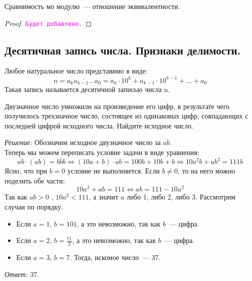 \documentclass[11pt]{article}
\begin{document}
\begin{statement}

    Сравнимость мо модулю~--- отношение эквивалентности.

\end{statement}
\begin{proof}

    \textcolor{magenta}{\texttt{Будет добавлено.}}

\end{proof}

\subsection{Десятичная запись числа. Признаки делимости.}

\begin{definition}
    Любое натуральное число представимо в виде:
\[ n = \overline{a_{k}a_{k - 1}\ldots a_0} = a_k \cdot 10^k + a_{k - 1} \cdot 10^{k -1} + \ldots + a_0 \]
Такая запись называется десятичной записью числа n.
\end{definition}

\begin{example}
	Двузначное число умножили на произведение его цифр, в результате чего получилось трехзначное число, состоящее из одинаковых цифр, совпадающих с последней цифрой исходного числа. Найдите исходное число.
\end{example}
\textit{Решение:}
Обозначим исходное двузначное число за $\overline{ab}$.\\
Теперь мы можем переписать условие задачи в виде уравнения:
\[ \overline{ab} \cdot (ab) = \overline{bbb} \Leftrightarrow
(10a + b) \cdot ab = 100b + 10b + b \Leftrightarrow
10a^2b + ab^2 = 111b \]
Ясно, что при $b = 0$ условие не выполняется. Если $b \neq 0$, то на него можно поделить обе части:
\[10a^2 + ab = 111 \Leftrightarrow ab = 111 - 10a^2\]
Так как $ab > 0$ , $10a^2 < 111$, а значит $a$ либо 1, либо 2, либо 3. Рассмотрим случаи по порядку.
\begin{itemize}
	\item Если $a = 1$, $b = 101$, а это невозможно, так как $b$~--- цифра.
	\item Если $a = 2$, $b = \frac{71}{2}$, а это невозможно, так как $b$~--- цифра.
	\item Если $a = 3$, $b = 7$. Тогда, искомое число~--- 37.
\end{itemize}
\textit{Ответ:} 37.
\end{document}
